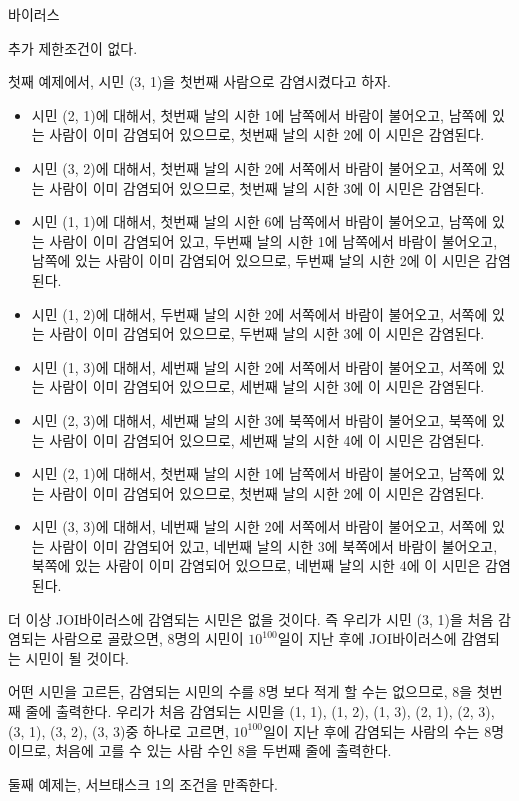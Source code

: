 \begin{problem}{바이러스}
	
	
	추가 제한조건이 없다.
	
	\Examples
	
	\begin{example}
	\end{example}
	
	\Note
	
	첫째 예제에서, 시민 (3, 1)을 첫번째 사람으로 감염시켰다고 하자.
	
	\begin{itemize}
		\item 시민 (2, 1)에 대해서, 첫번째 날의 시한 1에 남쪽에서 바람이 불어오고, 남쪽에 있는 사람이 이미 감염되어 있으므로, 첫번째 날의 시한 2에 이 시민은 감염된다.
		\item 시민 (3, 2)에 대해서, 첫번째 날의 시한 2에 서쪽에서 바람이 불어오고, 서쪽에 있는 사람이 이미 감염되어 있으므로, 첫번째 날의 시한 3에 이 시민은 감염된다.
		\item 시민 (1, 1)에 대해서, 첫번째 날의 시한 6에 남쪽에서 바람이 불어오고, 남쪽에 있는 사람이 이미 감염되어 있고, 두번째 날의 시한 1에 남쪽에서 바람이 불어오고, 남쪽에 있는 사람이 이미 감염되어 있으므로, 두번째 날의 시한 2에 이 시민은 감염된다.
		\item 시민 (1, 2)에 대해서, 두번째 날의 시한 2에 서쪽에서 바람이 불어오고, 서쪽에 있는 사람이 이미 감염되어 있으므로, 두번째 날의 시한 3에 이 시민은 감염된다.
		\item 시민 (1, 3)에 대해서, 세번째 날의 시한 2에 서쪽에서 바람이 불어오고, 서쪽에 있는 사람이 이미 감염되어 있으므로, 세번째 날의 시한 3에 이 시민은 감염된다.
		\item 시민 (2, 3)에 대해서, 세번째 날의 시한 3에 북쪽에서 바람이 불어오고, 북쪽에 있는 사람이 이미 감염되어 있으므로, 세번째 날의 시한 4에 이 시민은 감염된다.
		\item 시민 (2, 1)에 대해서, 첫번째 날의 시한 1에 남쪽에서 바람이 불어오고, 남쪽에 있는 사람이 이미 감염되어 있으므로, 첫번째 날의 시한 2에 이 시민은 감염된다.
		\item 시민 (3, 3)에 대해서, 네번째 날의 시한 2에 서쪽에서 바람이 불어오고, 서쪽에 있는 사람이 이미 감염되어 있고, 네번째 날의 시한 3에 북쪽에서 바람이 불어오고, 북쪽에 있는 사람이 이미 감염되어 있으므로, 네번째 날의 시한 4에 이 시민은 감염된다.
	\end{itemize}

	더 이상 JOI바이러스에 감염되는 시민은 없을 것이다. 즉 우리가 시민 (3, 1)을 처음 감염되는 사람으로 골랐으면, 8명의 시민이 $10^{100}$일이 지난 후에 JOI바이러스에 감염되는 시민이 될 것이다.
	
	어떤 시민을 고르든, 감염되는 시민의 수를 8명 보다 적게 할 수는 없으므로, 8을 첫번째 줄에 출력한다. 우리가 처음 감염되는 시민을 (1, 1), (1, 2), (1, 3), (2, 1), (2, 3), (3, 1), (3, 2), (3, 3)중 하나로 고르면, $10^{100}$일이 지난 후에 감염되는 사람의 수는 8명이므로, 처음에 고를 수 있는 사람 수인 8을 두번째 줄에 출력한다.
	
	둘째 예제는, 서브태스크 1의 조건을 만족한다.
	
\end{problem}

